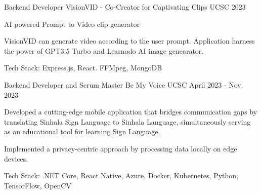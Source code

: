 

\begin{cventries}


    \cventry
    {Backend Developer} %
    {VisionVID - Co-Creator for Captivating Clips \href{https://visionvid.vercel.app/}{\faGithubSquare}} %
    {UCSC} %
    {2023} %
    {
        \begin{cvitems} %
            \item {AI powered Prompt to Video clip generator}
            \item {VisionVID can generate video according to the user prompt. Application harness the power of GPT3.5 Turbo and Learnado AI image genearator. }
            \item {Tech Stack: Express.js, React. FFMpeg, MongoDB}
        \end{cvitems}
    }

    \cventry
    {Backend Developer and Scrum Master} %
    {Be My Voice \href{https://github.com/kulasinghet/backend-be-voice}{\faGithubSquare}} %
    {UCSC} %
    {April 2023 - Nov. 2023} %
    {
        \begin{cvitems} %
            \item {Developed a cutting-edge mobile application that bridges communication gaps by translating Sinhala Sign Language to Sinhala Language, simultaneously serving as an educational tool for learning Sign Language.}
            \item {Implemented a privacy-centric approach by processing data locally on edge devices.}
            \item {Tech Stack: .NET Core, React Native, Azure, Docker, Kubernetes, Python, TensorFlow, OpenCV}
        \end{cvitems}
    }




\end{cventries}
